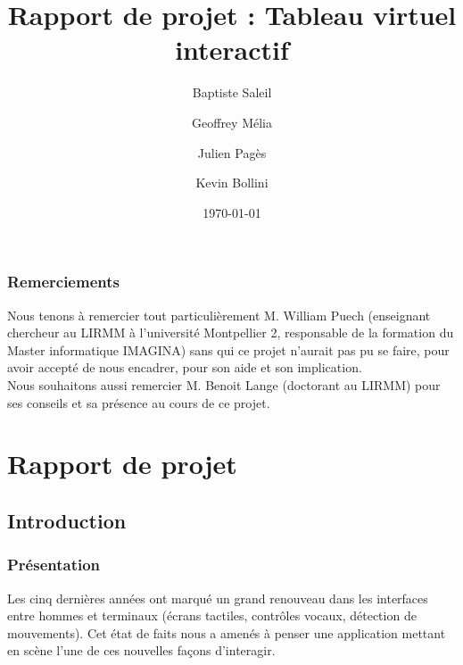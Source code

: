 \documentclass{report}
\title{Rapport de projet : Tableau virtuel interactif}
\author{Baptiste Saleil \and Geoffrey Mélia \and Julien Pagès \and Kevin Bollini}
\date{\today}
\begin{document}
	\maketitle
	\thispagestyle{empty}
	\newpage
	
	\tableofcontents

	\listoffigures
	
	\newpage
	\section*{Remerciements}
	
	Nous tenons à remercier tout particulièrement M. William Puech (enseignant chercheur au LIRMM à l'université Montpellier 2, responsable de la formation du Master informatique IMAGINA) sans qui ce projet n'aurait pas pu se faire, pour avoir accepté de nous encadrer, pour son aide et son implication.\\
	Nous souhaitons aussi remercier M. Benoit Lange (doctorant au LIRMM) pour ses conseils et sa présence au cours de ce projet. \\
	\part{Rapport de projet}
	\newpage
	\chapter{Introduction}
		\section{Présentation}		
		Les cinq dernières années ont marqué un grand renouveau dans les interfaces entre hommes et terminaux (écrans tactiles, contrôles vocaux, détection de mouvements). Cet état de faits nous a amenés à penser une application mettant en scène l'une de ces nouvelles façons d'interagir.\\
\end{document}
